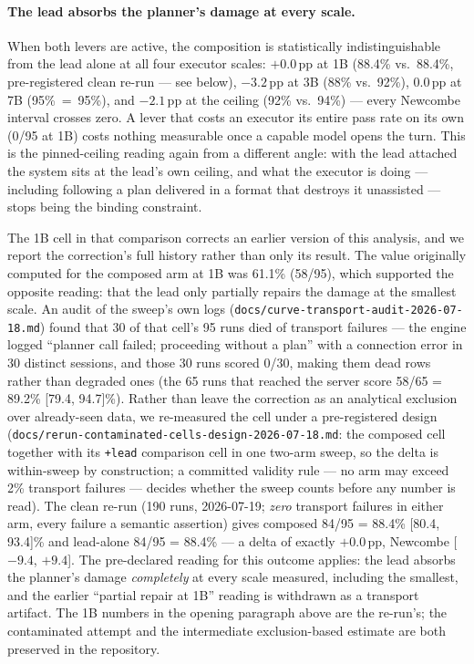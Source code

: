 \documentclass[smallcondensed,natbib]{svjour3}
\begin{document}
\paragraph{The lead absorbs the planner's damage at every scale.} When
both levers are active, the composition is statistically
indistinguishable from the lead alone at all four executor scales:
$+0.0$\,pp at 1B (88.4\% vs.\ 88.4\%, pre-registered clean re-run ---
see below), $-3.2$\,pp at 3B (88\% vs.\
92\%), $0.0$\,pp at 7B (95\%~=~95\%), and $-2.1$\,pp at the ceiling
(92\% vs.\ 94\%) --- every Newcombe interval crosses zero. A lever that
costs an executor its entire pass rate on its own (0/95 at 1B) costs
nothing measurable once a capable model opens the turn. This is the
pinned-ceiling reading again from a different angle: with the lead
attached the system sits at the lead's own ceiling, and what the
executor is doing --- including following a plan delivered in a format
that destroys it unassisted --- stops being the binding constraint.

The 1B cell in that comparison corrects an earlier version of this
analysis, and we report the correction's full history rather than only
its result. The value originally computed for the composed arm at 1B
was 61.1\% (58/95), which supported the opposite reading: that the
lead only partially repairs the damage at the smallest scale. An audit
of the sweep's own logs
(\texttt{docs/curve-transport-audit-2026-07-18.md}) found that 30 of
that cell's 95 runs died of transport failures --- the engine logged
``planner call failed; proceeding without a plan'' with a connection
error in 30 distinct sessions, and those 30 runs scored 0/30, making
them dead rows rather than degraded ones (the 65 runs that reached the
server score 58/65 = 89.2\% [79.4, 94.7]\%). Rather than leave the
correction as an analytical exclusion over already-seen data, we
re-measured the cell under a pre-registered design
(\texttt{docs/rerun-contaminated-cells-design-2026-07-18.md}: the
composed cell together with its \texttt{+lead} comparison cell in one
two-arm sweep, so the delta is within-sweep by construction; a
committed validity rule --- no arm may exceed 2\% transport failures
--- decides whether the sweep counts before any number is read). The
clean re-run (190 runs, 2026-07-19; \emph{zero} transport failures in
either arm, every failure a semantic assertion) gives composed 84/95 =
88.4\% [80.4, 93.4]\% and lead-alone 84/95 = 88.4\% --- a delta of
exactly $+0.0$\,pp, Newcombe [$-9.4$, $+9.4$]. The pre-declared
reading for this outcome applies: the lead absorbs the planner's
damage \emph{completely} at every scale measured, including the
smallest, and the earlier ``partial repair at 1B'' reading is
withdrawn as a transport artifact. The 1B numbers in the opening
paragraph above are the re-run's; the contaminated attempt and the
intermediate exclusion-based estimate are both preserved in the
repository.
\end{document}
